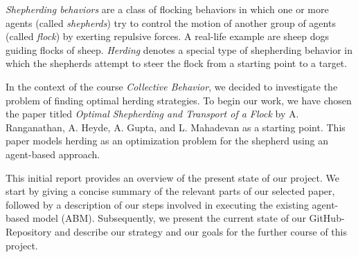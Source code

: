 \textit{Shepherding behaviors} are a class of flocking behaviors in which one or more agents (called \textit{shepherds}) try to control the motion of another group of agents (called \textit{flock}) by exerting repulsive forces. A real-life example are sheep dogs guiding flocks of sheep. \textit{Herding} denotes a special type of shepherding behavior in which the shepherds attempt to steer the flock from a starting point to a target. \cite{lien2003shepherding}

In the context of the course \textit{Collective Behavior}, we decided to investigate the problem of finding optimal herding strategies. To begin our work, we have chosen the paper titled \textit{Optimal Shepherding and Transport of a Flock} \cite{ranganathan2022optimal} by A. Ranganathan, A. Heyde, A. Gupta, and L. Mahadevan as a starting point. This paper models herding as an optimization problem for the shepherd using an agent-based approach.

This initial report provides an overview of the present state of our project. We start by giving a concise summary of the relevant parts of our selected paper, followed by a description of our steps involved in executing the existing agent-based model (ABM). Subsequently, we present the current state of our GitHub-Repository and describe our strategy and our goals for the further course of this project.
